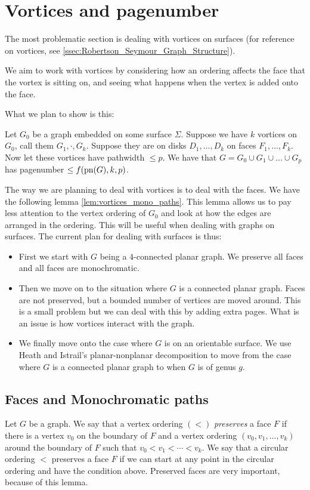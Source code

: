 \section{Vortices and pagenumber}
The most problematic section is dealing with vortices on surfaces (for reference on vortices, see \cref{ssec:Robertson_Seymour_Graph_Structure}).

We aim to work with vortices by considering how an ordering affects the face that the vortex is sitting on, and seeing what happens when the vertex is added onto the face.

What we plan to show is this:
\begin{conjecture}
	Let \(G_0\) be a graph embedded on some surface \(\Sigma\). Suppose we have \(k\) vortices on \(G_0\), call them \(G_1, \cdot , G_k\). Suppose they are on disks \(D_1, \ldots, D_k\) on faces \(F_1, \ldots, F_k\). Now let these vortices have pathwidth \(\leq p\). 
	We have that \(G = G_0 \cup G_1 \cup \ldots \cup G_p\) has pagenumber \(\leq f(\text{pn}(G), k, p)\).
\end{conjecture}
The way we are planning to deal with vortices is to deal with the faces. We have the following lemma \cref{lem:vortices_mono_paths}. This lemma allows us to pay less attention to the vertex ordering of \(G_0\) and look at how the edges are arranged in the ordering. This will be useful when dealing with graphs on surfaces.
The current plan for dealing with surfaces is thus:
\begin{itemize}
	\item First we start with \(G\) being a \(4\)-connected planar graph. We preserve all faces and all faces are monochromatic.
	\item Then we move on to the situation where \(G\) is a connected planar graph. Faces are not preserved, but a bounded number of vertices are moved around. This is a small problem but we can deal with this by adding extra pages. What is an issue is how vortices interact with the graph. 
	\item We finally move onto the case where \(G\) is on an orientable surface. We use Heath and Istrail's \cite{heathPagenumberGenusGraphs1992} planar-nonplanar decomposition to move from the case where \(G\) is a connected planar graph to when \(G\) is of genus \(g\). 
\end{itemize}

\subsection{Faces and Monochromatic paths}
Let \(G\) be a graph. We say that a vertex ordering \((<)\) \textit{preserves} a face \(F\) if there is a vertex \(v_0\) on the boundary of \(F\) and a vertex ordering \((v_0, v_1, \ldots, v_k)\) around the boundary of \(F\) such that \(v_0 < v_1 < \cdots < v_k\). We say that a circular ordering \(<\) preserves a face \(F\) if we can start at any point in the circular ordering and have the condition above. 
Preserved faces are very important, because of this lemma.

